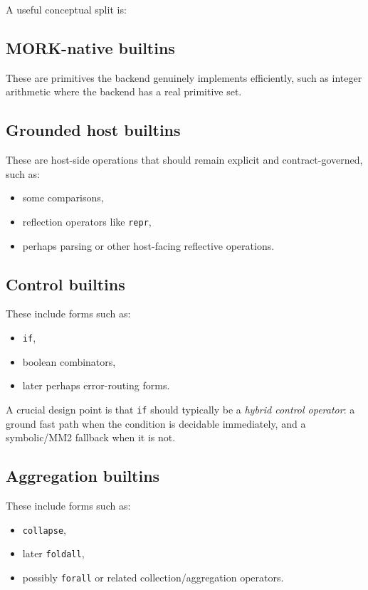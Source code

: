 \documentclass[11pt]{article}
\begin{document}
A useful conceptual split is:

\subsection{MORK-native builtins}
These are primitives the backend genuinely implements efficiently, such as integer arithmetic where the backend has a real primitive set.

\subsection{Grounded host builtins}
These are host-side operations that should remain explicit and contract-governed, such as:
\begin{itemize}
  \item some comparisons,
  \item reflection operators like \texttt{repr},
  \item perhaps parsing or other host-facing reflective operations.
\end{itemize}

\subsection{Control builtins}
These include forms such as:
\begin{itemize}
  \item \texttt{if},
  \item boolean combinators,
  \item later perhaps error-routing forms.
\end{itemize}

A crucial design point is that \texttt{if} should typically be a \emph{hybrid control operator}: a ground fast path when the condition is decidable immediately, and a symbolic/MM2 fallback when it is not.

\subsection{Aggregation builtins}
These include forms such as:
\begin{itemize}
  \item \texttt{collapse},
  \item later \texttt{foldall},
  \item possibly \texttt{forall} or related collection/aggregation operators.
\end{itemize}
\end{document}
